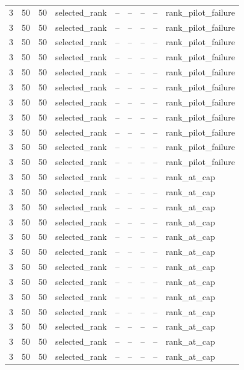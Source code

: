 \begin{longtable}{lllllllll}
3 & 50 & 50 & selected\_rank & -- & -- & -- & -- & rank\_pilot\_failure \\
3 & 50 & 50 & selected\_rank & -- & -- & -- & -- & rank\_pilot\_failure \\
3 & 50 & 50 & selected\_rank & -- & -- & -- & -- & rank\_pilot\_failure \\
3 & 50 & 50 & selected\_rank & -- & -- & -- & -- & rank\_pilot\_failure \\
3 & 50 & 50 & selected\_rank & -- & -- & -- & -- & rank\_pilot\_failure \\
3 & 50 & 50 & selected\_rank & -- & -- & -- & -- & rank\_pilot\_failure \\
3 & 50 & 50 & selected\_rank & -- & -- & -- & -- & rank\_pilot\_failure \\
3 & 50 & 50 & selected\_rank & -- & -- & -- & -- & rank\_pilot\_failure \\
3 & 50 & 50 & selected\_rank & -- & -- & -- & -- & rank\_pilot\_failure \\
3 & 50 & 50 & selected\_rank & -- & -- & -- & -- & rank\_pilot\_failure \\
3 & 50 & 50 & selected\_rank & -- & -- & -- & -- & rank\_pilot\_failure \\
3 & 50 & 50 & selected\_rank & -- & -- & -- & -- & rank\_at\_cap \\
3 & 50 & 50 & selected\_rank & -- & -- & -- & -- & rank\_at\_cap \\
3 & 50 & 50 & selected\_rank & -- & -- & -- & -- & rank\_at\_cap \\
3 & 50 & 50 & selected\_rank & -- & -- & -- & -- & rank\_at\_cap \\
3 & 50 & 50 & selected\_rank & -- & -- & -- & -- & rank\_at\_cap \\
3 & 50 & 50 & selected\_rank & -- & -- & -- & -- & rank\_at\_cap \\
3 & 50 & 50 & selected\_rank & -- & -- & -- & -- & rank\_at\_cap \\
3 & 50 & 50 & selected\_rank & -- & -- & -- & -- & rank\_at\_cap \\
3 & 50 & 50 & selected\_rank & -- & -- & -- & -- & rank\_at\_cap \\
3 & 50 & 50 & selected\_rank & -- & -- & -- & -- & rank\_at\_cap \\
3 & 50 & 50 & selected\_rank & -- & -- & -- & -- & rank\_at\_cap \\
3 & 50 & 50 & selected\_rank & -- & -- & -- & -- & rank\_at\_cap \\
3 & 50 & 50 & selected\_rank & -- & -- & -- & -- & rank\_at\_cap \\

\end{longtable}
